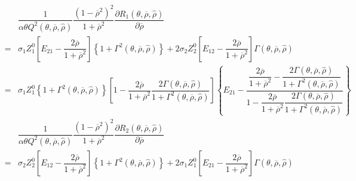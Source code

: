 \documentclass[10pt]{article}
\begin{document}
{\footnotesize \begin{eqnarray*}
& & \dfrac{1}{\alpha \theta Q^2 (\theta, \overline{\rho}, {\hat \rho})} \dfrac{(1 - \overline{\rho}^2)^2}{1 + \overline{\rho}^2} \dfrac{\partial R_1 (\theta, \overline{\rho}, {\hat \rho})}{\partial \overline{\rho}} \\
& = & \sigma_1 Z_1^0 \left[ E_{2 1} - \dfrac{2 \overline{\rho}}{1 + \overline{\rho}^2} \right] \left\{ 1 + \Gamma^2 (\theta, \overline{\rho}, {\hat \rho}) \right\} + 2 \sigma_2 Z_2^0 \left[ E_{1 2} - \dfrac{2 \overline{\rho}}{1 + \overline{\rho}^2} \right] \Gamma (\theta, \overline{\rho}, {\hat \rho}) \\
& = & \sigma_1 Z_1^0 \left\{ 1 + \Gamma^2 (\theta, \overline{\rho}, {\hat \rho}) \right\} \left[ 1 - \dfrac{2 \overline{\rho}}{1 + \overline{\rho}^2} \dfrac{2 \Gamma (\theta, \overline{\rho}, {\hat \rho})}{1 + \Gamma^2 (\theta, \overline{\rho}, {\hat \rho})} 
\right] \left\{ E_{2 1} - \dfrac{\dfrac{2 \overline{\rho}}{1 + \overline{\rho}^2} - \dfrac{2 \Gamma (\theta, \overline{\rho}, {\hat \rho})}{1 + \Gamma^2 (\theta, \overline{\rho}, {\hat \rho})}}{1 - \dfrac{2 \overline{\rho}}{1 + \overline{\rho}^2} \dfrac{2 \Gamma (\theta, \overline{\rho}, {\hat \rho})}{1 + \Gamma^2 (\theta, \overline{\rho}, {\hat \rho})}} \right\} \\
& & \dfrac{1}{\alpha \theta Q^2 (\theta, \overline{\rho}, {\hat \rho})} \dfrac{(1 - \overline{\rho}^2)^2}{1 + \overline{\rho}^2} \dfrac{\partial R_2 (\theta, \overline{\rho}, {\hat \rho})}{\partial \overline{\rho}} \\
& = & \sigma_2 Z_2^0 \left[ E_{1 2} - \dfrac{2 \overline{\rho}}{1 + \overline{\rho}^2} \right] \left\{ 1 + \Gamma^2 (\theta, \overline{\rho}, {\hat \rho}) \right\} + 2 \sigma_1 Z_1^0 \left[ E_{2 1} - \dfrac{2 \overline{\rho}}{1 + \overline{\rho}^2} \right] \Gamma (\theta, \overline{\rho}, {\hat \rho}) \\

\end{eqnarray*}}
\end{document}
